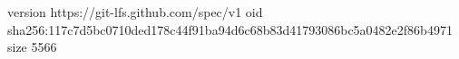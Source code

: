 version https://git-lfs.github.com/spec/v1
oid sha256:117c7d5bc0710ded178c44f91ba94d6c68b83d41793086bc5a0482e2f86b4971
size 5566
